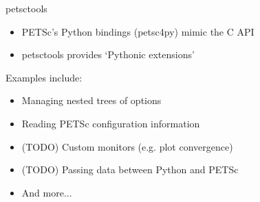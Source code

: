 \documentclass[aspectratio=169]{beamer}
\begin{document}
\begin{frame}{petsctools}
  \begin{itemize}
    \item
      PETSc's Python bindings (petsc4py) mimic the C API
    \item
      petsctools provides `Pythonic extensions'
  \end{itemize}

  \pause

  Examples include:

  \begin{itemize}
    \item
      Managing nested trees of options
    \item
      Reading PETSc configuration information
    \item
      (TODO) Custom monitors (e.g. plot convergence)
    \item
      (TODO) Passing data between Python and PETSc
    \item
      And more...
  \end{itemize}

  \pause

\end{frame}
\end{document}
